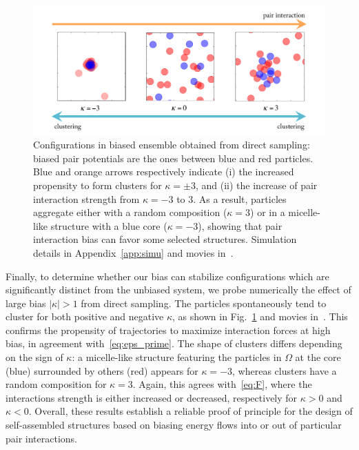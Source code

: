 \documentclass[pre, superscriptaddress, twocolumn,pre]{revtex4-1}
\begin{document}
\begin{figure}
	\centering
	\includegraphics[width=.9\linewidth]{fig4.pdf}
	\caption{\label{fig:outofperturbation}
	Configurations in biased ensemble obtained from direct sampling: biased pair potentials are the ones between blue and red particles. Blue and orange arrows respectively indicate (i) the increased propensity to form clusters for $\kappa=\pm3$, and (ii) the increase of pair interaction strength from $\kappa=-3$ to $3$. As a result, particles aggregate either with a random composition ($\kappa=3$) or in a micelle-like structure with a blue core ($\kappa=-3$), showing that pair interaction bias can favor some selected structures.
		Simulation details in Appendix~\ref{app:simu} and movies in~\cite{movie}.
	}
\end{figure}


Finally, to determine whether our bias can stabilize configurations which are significantly distinct from the unbiased system, we probe numerically the effect of large bias $|\kappa|>1$ from direct sampling. The particles spontaneously tend to cluster for both positive and negative $\kappa$, as shown in Fig.~\ref{fig:outofperturbation} and movies in~\cite{movie}. This confirms the propensity of trajectories to maximize interaction forces at high bias, in agreement with~\eqref{eq:eps_prime}. The shape of clusters differs depending on the sign of $\kappa$: a micelle-like structure featuring the particles in $\Omega$ at the core (blue) surrounded by others (red) appears for $\kappa=-3$, whereas clusters have a random composition for $\kappa=3$. Again, this agrees with~\eqref{eq:F}, where the interactions strength is either increased or decreased, respectively for $\kappa>0$ and $\kappa<0$. Overall, these results establish a reliable proof of principle for the design of self-assembled structures based on biasing energy flows into or out of particular pair interactions.


\end{document}
